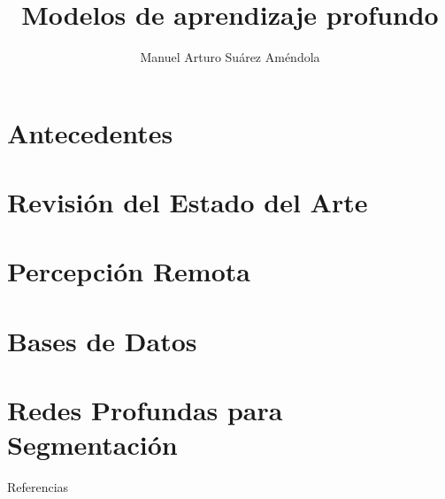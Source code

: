 \documentclass[11pt]{beamer}
\title[Seminario de UAM]
{Modelos de aprendizaje profundo}
\author[Suárez, M.A.]{Manuel Arturo Suárez Améndola}
\begin{document}


\section{Antecedentes}


\section{Revisión del Estado del Arte}


\section{Percepción Remota}


\section{Bases de Datos}


\section{Redes Profundas para Segmentación}


\nocite{*}
\begin{frame}[allowframebreaks]{Referencias}


\end{frame}
\end{document}
